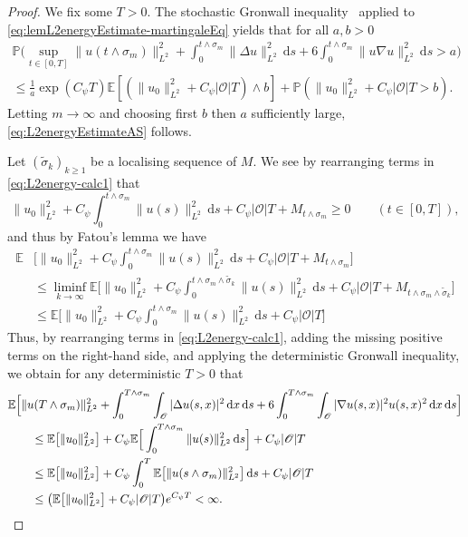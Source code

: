 \documentclass[reqno]{amsart}
\newcommand{\E}{\mathbb{E}}
\renewcommand{\P}{\mathbb{P}}
\newcommand{\sO}{\mathscr{O}}
\newcommand{\1}{\mathbf{1}}
\newcommand{\grad}{\nabla}
\newcommand{\ds}{\,\mathrm{d}s}
\newcommand{\dx}{\,\mathrm{d}x}
\newcommand{\inttm}{\int_0^{t\wedge\sigma_m}}
\newcommand{\intsO}{\int_{\sO}}
\begin{document}
\begin{proof}
    We fix some $T>0$. The stochastic Gronwall inequality~\cite[Corollary 5.4]{Geiss24} applied to \eqref{eq:lemL2energyEstimate-martingaleEq} yields that for all $a,b>0$
    \begin{equation*}
    \begin{aligned}
     \P\bigg(\sup_{t\in[0,T]} \|u(t\wedge\sigma_m)\|_{L^2}^2 + \inttm \|\Delta u\|_{L^2}^2\ds + 6  \inttm \|u\grad u\|_{L^2}^2\ds > a \bigg) \\
     \leq \frac{1}{a}\exp(C_\psi T)
     \E\left[ (\|u_0\|_{L^2}^2 +C_\psi|\sO|T) \wedge b\right] + \P\left( \|u_0\|_{L^2}^2 +C_\psi|\sO|T  >b\right).
    \end{aligned}
    \end{equation*}
    Letting $m\to\infty$ and choosing first $b$ then $a$ sufficiently large, \eqref{eq:L2energyEstimateAS} follows.
    
Let $(\tilde{\sigma}_k)_{k \ge 1}$ be a localising sequence of $M$. We see by rearranging terms in \eqref{eq:L2energy-calc1} that
\begin{equation*}
\|u_0\|_{L^2}^2 + C_\psi \inttm  \|u(s)\|_{L^2}^2 \ds +C_\psi|\sO|T + M_{t\wedge\sigma_m} \geq 0 \qquad (t\in[0,T]),
\end{equation*}
and thus by Fatou's lemma we have
\begin{align*}
     \E&\Big[\|u_0\|_{L^2}^2 + C_\psi \inttm \|u(s)\|_{L^2}^2 \ds +C_\psi|\sO|T + M_{t\wedge\sigma_m}\Big] \\
      &\leq \liminf_{k\to\infty} \E\Big[\|u_0\|_{L^2}^2 + C_\psi \int_0^{t\wedge\sigma_m\wedge\tilde{\sigma}_k} \|u(s)\|_{L^2}^2\ds +C_\psi|\sO|T + M_{t\wedge\sigma_m\wedge \tilde{\sigma}_k}\Big] \\
      &\leq \E\Big[\|u_0\|_{L^2}^2 + C_\psi \inttm \|u(s)\|_{L^2}^2\ds+C_\psi|\sO|T\Big]
\end{align*}
Thus, by rearranging terms in \eqref{eq:L2energy-calc1}, adding the missing positive terms on the right-hand side, and applying the deterministic Gronwall inequality, we obtain for any deterministic $T>0$ that 
    \begin{align*}
        & \E\Big[\|u(T\wedge \sigma_m)\|_{L^2}^2 + \int_0^{T\land \sigma_m} \intsO|\Delta u(s,x)|^2 \dx\ds + 6 \int_0^{T\land \sigma_m} \intsO |\grad u(s,x)|^2u(s,x)^2\dx\ds\Big]  \\
        & \qquad \leq \E\big[ \|u_0\|_{L^2}^2\big] + C_\psi \E\Big[ \int_0^{T\wedge\sigma_m} \|u(s)\|_{L^2}^2\ds \Big] +C_\psi|\sO|T \\
         & \qquad \leq  \E\big[ \|u_0\|_{L^2}^2\big] + C_\psi \int_0^T \E\big[ \|u(s\wedge \sigma_m)\|_{L^2}^2\big]\ds +C_\psi|\sO|T \\
         & \qquad \leq   \big(\E\big[ \|u_0\|_{L^2}^2\big]+C_\psi|\sO|T\big) e^{C_\psi T} <\infty. \qedhere
    \end{align*}
    \end{proof}
\end{document}
